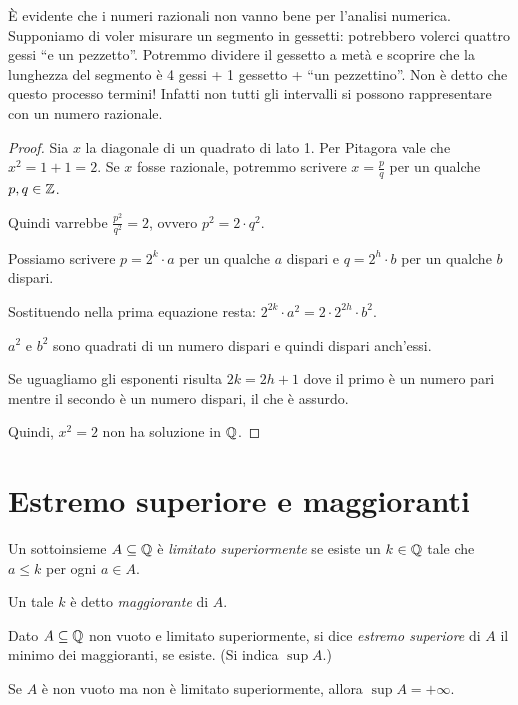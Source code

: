 È evidente che i numeri razionali non vanno bene per l'analisi numerica. Supponiamo di voler misurare un segmento in gessetti: potrebbero volerci quattro gessi ``e un pezzetto''. Potremmo dividere il gessetto a metà e scoprire che la lunghezza del segmento è 4 gessi + 1 gessetto + ``un pezzettino''. Non è detto che questo processo termini! Infatti non tutti gli intervalli si possono rappresentare con un numero razionale.  

\begin{proof}
Sia $x$ la diagonale di un quadrato di lato 1. Per Pitagora vale che $x^2 = 1 + 1 = 2$. Se $x$ fosse razionale, potremmo scrivere $x = \frac{p}{q}$ per un qualche $p,q \in \mathbb Z$. 

Quindi varrebbe $\frac{p^2}{q^2} = 2$, ovvero $p^2 = 2\cdot q^2$.

Possiamo scrivere $p = 2^k \cdot a$ per un qualche $a$ dispari e $q = 2^h \cdot b$ per un qualche $b$ dispari.

Sostituendo nella prima equazione resta: $2^{2k} \cdot a^2 = 2 \cdot 2^{2h} \cdot b^2$.

$a^2$ e $b^2$ sono quadrati di un numero dispari e quindi dispari anch'essi.

Se uguagliamo gli esponenti risulta $2k = 2h + 1$ dove il primo è un numero pari mentre il secondo è un numero dispari, il che è assurdo.

Quindi, $x^2 = 2$ non ha soluzione in $\mathbb Q$.
\end{proof}

\section{Estremo superiore e maggioranti}

\begin{definition}
Un sottoinsieme $A \subseteq \mathbb Q$ è \emph{limitato superiormente} se esiste un $k \in \mathbb Q$ tale che $a \le k$ per ogni $a \in A$. 

Un tale $k$ è detto \emph{maggiorante} di $A$.
\end{definition}

\begin{definition}
Dato $A \subseteq \mathbb Q$ non vuoto e limitato superiormente, si dice \emph{estremo superiore} di $A$ il minimo dei maggioranti, se esiste. (Si indica $\sup A$.)
\end{definition}

Se $A$ è non vuoto ma non è limitato superiormente, allora $\sup A = + \infty$.

